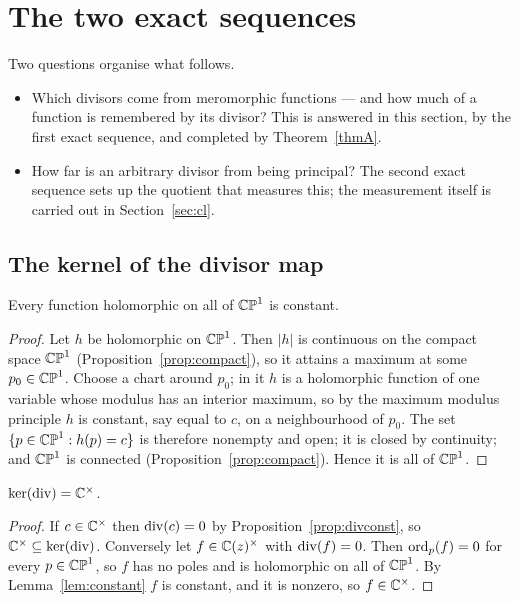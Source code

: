 \section{The two exact sequences}\label{sec:exact}

Two questions organise what follows.
\begin{itemize}[leftmargin=1.5em,itemsep=0.15em]
\item Which divisors come from meromorphic functions --- and how much of a
function is remembered by its divisor? This is answered in this section, by the
first exact sequence, and completed by Theorem~\ref{thmA}.
\item How far is an arbitrary divisor from being principal? The second exact
sequence sets up the quotient that measures this; the measurement itself is
carried out in Section~\ref{sec:cl}.
\end{itemize}

\subsection{The kernel of the divisor map}

\begin{smjlemma}\label{lem:constant}
Every function holomorphic on all of $\mathbb{CP}^1$ is constant.
\end{smjlemma}

\begin{proof}
Let $h$ be holomorphic on $\mathbb{CP}^1$. Then $|h|$ is continuous on the compact space
$\mathbb{CP}^1$ (Proposition~\ref{prop:compact}), so it attains a maximum at some
$p_0 \in \mathbb{CP}^1$. Choose a chart around $p_0$; in it $h$ is a holomorphic function
of one variable whose modulus has an interior maximum, so by the maximum modulus
principle \cite[Ch.~4]{Ahlfors} $h$ is constant, say equal to $c$, on a
neighbourhood of $p_0$. The set $\{p \in \mathbb{CP}^1 : h(p) = c\}$ is therefore nonempty
and open; it is closed by continuity; and $\mathbb{CP}^1$ is connected
(Proposition~\ref{prop:compact}). Hence it is all of $\mathbb{CP}^1$.
\end{proof}

\begin{smjproposition}\label{prop:kernel}
$\ker(\operatorname{div}) = \mathbb{C}^\times$.
\end{smjproposition}

\begin{proof}
If $c \in \mathbb{C}^\times$ then $\operatorname{div}(c) = 0$ by Proposition~\ref{prop:divconst}, so
$\mathbb{C}^\times \subseteq \ker(\operatorname{div})$. Conversely let $f \in \mathbb{C}(z)^\times$ with
$\operatorname{div}(f) = 0$. Then $\operatorname{ord}_p(f) = 0$ for every $p \in \mathbb{CP}^1$, so $f$ has no poles
and is holomorphic on all of $\mathbb{CP}^1$. By Lemma~\ref{lem:constant} $f$ is constant,
and it is nonzero, so $f \in \mathbb{C}^\times$.
\end{proof}

